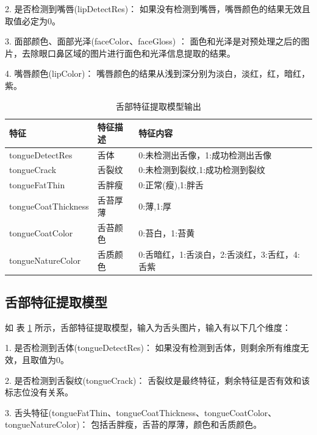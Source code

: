 2. 是否检测到嘴唇(lipDetectRes)： 如果没有检测到嘴唇，嘴唇颜色的结果无效且取值必定为0。

3. 面部颜色、面部光泽(faceColor、faceGloss) ： 面色和光泽是对预处理之后的图片，去除眼口鼻区域的图片进行面色和光泽信息提取的结果。

4. 嘴唇颜色(lipColor)： 嘴唇颜色的结果从浅到深分别为淡白，淡红，红，暗红，紫。

\begin{table}[]
    \centering
    \begin{tabular}{lll}
        \toprule
        特征 & 特征描述 & 特征内容 \\ 
        \midrule
        tongueDetectRes & 舌体 & 0:未检测出舌像，1:成功检测出舌像 \\
        tongueCrack & 舌裂纹 & 0:未检测到裂纹,1:成功检测到裂纹 \\ 
        tongueFatThin & 舌胖瘦 & 0:正常(瘦),1:胖舌 \\
        tongueCoatThickness & 舌苔厚薄 & 0:薄,1:厚 \\
        tongueCoatColor & 舌苔颜色 & 0:苔白，1:苔黄 \\
        tongueNatureColor & 舌质颜色 & 0:舌暗红，1:舌淡白，2:舌淡红，3:舌红，4:舌紫\\
        \bottomrule
    \end{tabular}

    \caption{舌部特征提取模型输出}
    \label{tab:tongue-feature}
\end{table}

\subsection{舌部特征提取模型}
如 表 \ref{tab:tongue-feature} 所示，舌部特征提取模型，输入为舌头图片，输入有以下几个维度：

1. 是否检测到舌体(tongueDetectRes)： 如果没有检测到舌体，则剩余所有维度无效，且取值为0。

2. 是否检测到舌裂纹(tongueCrack)： 舌裂纹是最终特征，剩余特征是否有效和该标志位没有关系。

3. 舌头特征(tongueFatThin、tongueCoatThickness、tongueCoatColor、tongueNatureColor)： 包括舌胖瘦，舌苔的厚薄，颜色和舌质颜色。

